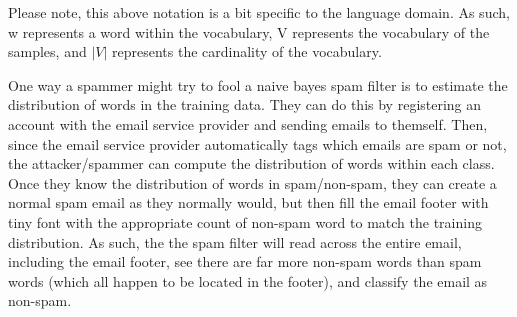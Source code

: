 Please note, this above notation is a bit specific to the language domain. As such, w represents a word within the vocabulary, V represents the vocabulary of the samples, and $\vert V \vert$ represents the cardinality of the vocabulary.

One way a spammer might try to fool a naive bayes spam filter is to estimate the distribution of words in the training data. They can do this by registering an account with the email service provider and sending emails to themself. Then, since the email service provider automatically tags which emails are spam or not, the attacker/spammer can compute the distribution of words within each class. Once they know the distribution of words in spam/non-spam, they can create a normal spam email as they normally would, but then fill the email footer with tiny font with the appropriate count of non-spam word to match the training distribution. As such, the the spam filter will read across the entire email, including the email footer, see there are far more non-spam words than spam words (which all happen to be located in the footer), and classify the email as non-spam.